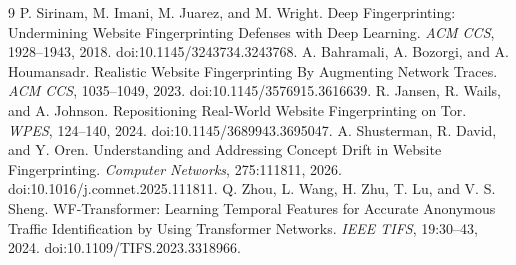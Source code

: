 \begin{thebibliography}{9}
P. Sirinam, M. Imani, M. Juarez, and M. Wright.
Deep Fingerprinting: Undermining Website Fingerprinting Defenses with Deep Learning.
\emph{ACM CCS}, 1928--1943, 2018. doi:10.1145/3243734.3243768.
A. Bahramali, A. Bozorgi, and A. Houmansadr.
Realistic Website Fingerprinting By Augmenting Network Traces.
\emph{ACM CCS}, 1035--1049, 2023. doi:10.1145/3576915.3616639.
R. Jansen, R. Wails, and A. Johnson.
Repositioning Real-World Website Fingerprinting on Tor.
\emph{WPES}, 124--140, 2024. doi:10.1145/3689943.3695047.
A. Shusterman, R. David, and Y. Oren.
Understanding and Addressing Concept Drift in Website Fingerprinting.
\emph{Computer Networks}, 275:111811, 2026. doi:10.1016/j.comnet.2025.111811.
Q. Zhou, L. Wang, H. Zhu, T. Lu, and V. S. Sheng.
WF-Transformer: Learning Temporal Features for Accurate Anonymous Traffic Identification by Using Transformer Networks.
\emph{IEEE TIFS}, 19:30--43, 2024. doi:10.1109/TIFS.2023.3318966.
\end{thebibliography}
